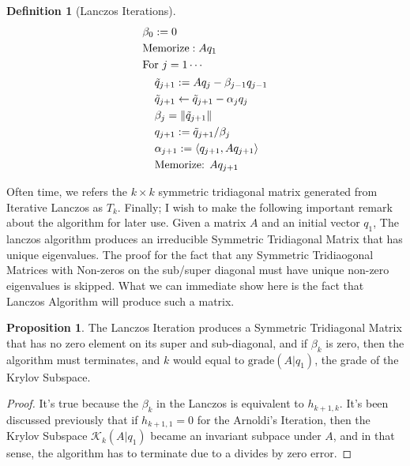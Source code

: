 \documentclass[]{article}
\theoremstyle{definition}
\newtheorem{prop}{Proposition}
\newtheorem{definition}{Definition}
\begin{document}
\begin{definition}[Lanczos Iterations]
\begin{align}
\begin{aligned}
                        & \beta_0 := 0
                        \\
                        & \text{Memorize}: Aq_1
                        \\
                        & \text{For }j = 1\cdots
                        \\
                        &\hspace{1.1em}
                        \begin{aligned}
                            & \tilde{q}_{j + 1} := Aq_j - \beta_{j - 1} q_{j - 1}
                            \\
                            & \tilde{q}_{j + 1} \leftarrow \tilde{q}_{j + 1} - \alpha_jq_j
                            \\
                            & \beta_j = \Vert \tilde{q}_{j + 1}\Vert
                            \\
                            & q_{j + 1}:= \tilde{q}_{j + 1}/\beta_j
                            \\
                            & \alpha_{j + 1} := \left\langle q_{j + 1}, Aq_{j + 1} \right\rangle
                            \\
                            & \text{Memorize: }Aq_{j + 1}
                        \end{aligned}
                    \end{aligned}
                \end{align}
            \end{definition}
            Often time, we refers the $k\times k$ symmetric tridiagonal matrix generated from Iterative Lanczos as $T_k$. Finally; I wish to make the following important remark about the algorithm for later use. Given a matrix $A$ and an initial vector $q_1$, The lanczos algorithm produces an irreducible Symmetric Tridiagonal Matrix that has unique eigenvalues. The proof for the fact that any Symmetric Tridiaogonal Matrices with Non-zeros on the sub/super diagonal must have unique non-zero eigenvalues is skipped. What we can immediate show here is the fact that Lanczos Algorithm will produce such a matrix. 
            \begin{prop}
                The Lanczos Iteration produces a Symmetric Tridiagonal Matrix that has no zero element on its super and sub-diagonal, and if $\beta_k$ is zero, then the algorithm must terminates, and $k$ would equal to $\text{grade}(A|q_1)$, the grade of the Krylov Subspace. 
            \end{prop}
            \begin{proof}
                It's true because the $\beta_{k}$ in the Lanczos is equivalent to $h_{k + 1, k}$. It's been discussed previously that if $h_{k + 1, 1} = 0$ for the Arnoldi's Iteration, then the Krylov Subspace $\mathcal K_k(A|q_1)$ became an invariant subpace under $A$, and in that sense, the algorithm has to terminate due to a divides by zero error. 
            \end{proof}
\end{document}

